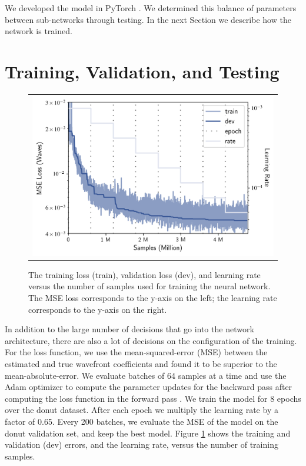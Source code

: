 We developed the model in PyTorch \cite{pytorch}. We determined this balance of parameters between sub-networks through testing. In the next Section we describe how the network is trained. 

\section{Training, Validation, and Testing}

\begin{figure}[!htbp]
\begin{center}
\begin{tabular}{c}
\includegraphics[width=\textwidth]{figs/cnn/training_curve.png}
\end{tabular}
\end{center}
\caption[Training Curve]{The training loss (train), validation loss (dev), and learning rate versus the number of samples used for training the neural network. The MSE loss corresponds to the y-axis on the left; the learning rate corresponds to the y-axis on the right.\label{fig:train}}
\end{figure}

In addition to the large number of decisions that go into the network architecture, there are also a lot of decisions on the configuration of the training. For the loss function, we use the mean-squared-error (MSE) between the estimated and true wavefront coefficients and found it to be superior to the mean-absolute-error. We evaluate batches of 64 samples at a time and use the Adam optimizer to compute the parameter updates for the backward pass after computing the loss function in the forward pass \cite{adam}. We train the model for 8 epochs over the donut dataset. After each epoch we multiply the learning rate by a factor of 0.65. Every 200 batches, we evaluate the MSE of the model on the donut validation set, and keep the best model. Figure \ref{fig:train} shows the training and validation (dev) errors, and the learning rate, versus the number of training samples.

